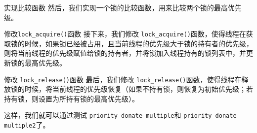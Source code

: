 \documentclass{beamer}
\begin{document}
\begin{frame}
\begin{block}{实现比较函数}
    然后，我们实现一个锁的比较函数，用来比较两个锁的最高优先级。
  \end{block}



  \begin{block}{修改\texttt{lock\_acquire()}函数}
    接下来，我们修改 \texttt{lock\_acquire()}函数，使得线程在获取锁的时候，如果锁已经被占用，且当前线程的优先级大于锁的持有者的优先级，则将当前线程的优先级赋值给锁的持有者，并将锁加入线程持有的锁列表中，并更新锁的最高优先级。
  \end{block}

    
    
    


  \framebreak

  \begin{block}{修改 \texttt{lock\_release()}函数}
    最后，我们修改 \texttt{lock\_release()}函数，使得线程在释放锁的时候，将当前线程的优先级恢复（如果不持有锁，则恢复为初始优先级；若持有锁，则设置为所持有锁的最高优先级）。
  \end{block}

%   
\framebreak

  这样，我们就可以通过测试 \texttt{priority-donate-multiple}和 \texttt{priority-donate-multiple2}了。

\end{frame}
\end{document}
